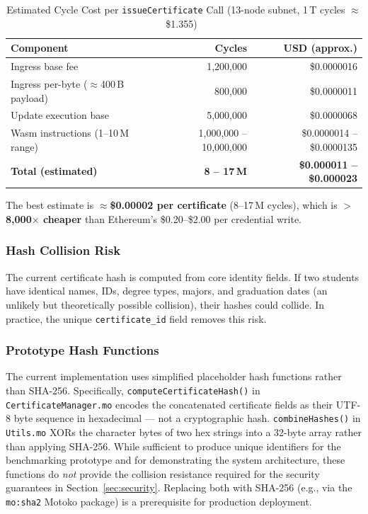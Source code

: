 \documentclass[journal]{IEEEtran}
\begin{document}
\begin{table}[t]
\caption{Estimated Cycle Cost per \texttt{issueCertificate} Call (13-node subnet, 1\,T cycles $\approx$ \$1.355)~\cite{dfinity2025gascost}}
\label{tab:cost_breakdown}
\centering\small\renewcommand{\arraystretch}{1.1}
\begin{tabular}{@{}lrr@{}}
\toprule
\textbf{Component} & \textbf{Cycles} & \textbf{USD (approx.)} \\
\midrule
Ingress base fee                      & 1,200,000                & \$0.0000016 \\
Ingress per-byte ($\approx$400\,B payload) & 800,000             & \$0.0000011 \\
Update execution base                 & 5,000,000                & \$0.0000068 \\
Wasm instructions (1--10\,M range)    & 1,000,000 -- 10,000,000  & \$0.0000014 -- \$0.0000135 \\
\midrule
\textbf{Total (estimated)}            & \textbf{8 -- 17\,M}     & \textbf{\$0.000011 -- \$0.000023} \\
\bottomrule
\end{tabular}
\end{table}

The best estimate is $\approx$\textbf{\$0.00002 per certificate} (8--17\,M cycles), which is $>$\textbf{8{,}000$\times$ cheaper} than Ethereum's \$0.20--\$2.00 per credential write.

\subsubsection{Hash Collision Risk}
The current certificate hash is computed from core identity fields. If two students have identical names, IDs, degree types, majors, and graduation dates (an unlikely but theoretically possible collision), their hashes could collide. In practice, the unique \texttt{certificate\_id} field removes this risk.

\subsubsection{Prototype Hash Functions}
The current implementation uses simplified placeholder hash functions rather than SHA-256. Specifically, \texttt{computeCertificateHash()} in \texttt{CertificateManager.mo} encodes the concatenated certificate fields as their UTF-8 byte sequence in hexadecimal — not a cryptographic hash. \texttt{combineHashes()} in \texttt{Utils.mo} XORs the character bytes of two hex strings into a 32-byte array rather than applying SHA-256. While sufficient to produce unique identifiers for the benchmarking prototype and for demonstrating the system architecture, these functions do \emph{not} provide the collision resistance required for the security guarantees in Section~\ref{sec:security}. Replacing both with SHA-256 (e.g., via the \texttt{mo:sha2} Motoko package) is a prerequisite for production deployment.
\end{document}
